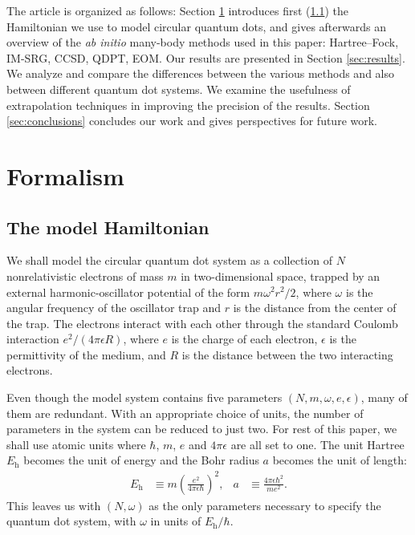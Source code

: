 The article is organized as follows: Section \ref{sec:formalism}
introduces first (\ref{subsec:modelHamiltonian}) the Hamiltonian we
use to model circular quantum dots, and gives afterwards an overview
of the \textit{ab initio} many-body methods used in this paper:
Hartree--Fock, IM-SRG, CCSD, QDPT, EOM.  Our results are presented in
Section \ref{sec:results}.  We analyze and compare the differences
between the various methods and also between different quantum dot
systems.  We examine the usefulness of extrapolation techniques in
improving the precision of the results.  Section \ref{sec:conclusions}
concludes our work and gives perspectives for future work.

\section{Formalism}
\label{sec:formalism}

\subsection{The model Hamiltonian}
\label{subsec:modelHamiltonian}

We shall model the circular quantum dot system as a collection of $N$
nonrelativistic electrons of mass $m$ in two-dimensional space,
trapped by an external harmonic-oscillator potential of the form
$m \omega^2r^2 / 2$, where $\omega$ is the angular frequency of the
oscillator trap and $r$ is the distance from the center of the trap.
The electrons interact with each other through the standard Coulomb
interaction $e^2 / (4 \pi \epsilon R)$, where $e$ is the charge of
each electron, $\epsilon$ is the permittivity of the medium, and $R$
is the distance between the two interacting electrons.

Even though the model system contains five parameters $(N, m, \omega,
e, \epsilon)$, many of them are redundant.  With an appropriate choice
of units, the number of parameters in the system can be reduced to
just two.  For rest of this paper, we shall use atomic units where
$\hbar$, $m$, $e$ and $4 \pi \epsilon$ are all set to one.  The unit
Hartree $E_{\mathrm{h}}$ becomes the unit of energy and the Bohr
radius $a$ becomes the unit of length:
\begin{align*}
  E_{\mathrm{h}} &\equiv m \left(\frac{e^2}{4 \pi \epsilon \hbar}\right)^2, &
  a &\equiv \frac{4 \pi \epsilon \hbar^2}{m e^2}.
\end{align*}
This leaves us with $(N, \omega)$ as the only parameters necessary to specify the quantum dot system, with $\omega$ in units of $E_{\mathrm{h}} / \hbar$.

